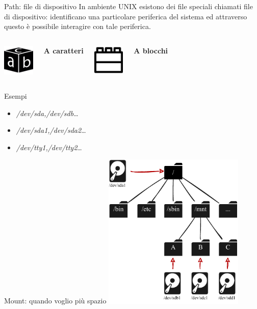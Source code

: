 \documentclass{beamer}
\begin{document}
    \begin{frame}{Path: file di dispositivo}
        In ambiente UNIX esistono dei file speciali chiamati file di dispositivo:
        identificano una particolare periferica del sistema ed attraverso questo è possibile interagire con tale periferica. \\
        \vspace{0.25cm}
        \begin{columns}[t, onlytextwidth]
                \centering
                \includegraphics[height=1.5cm, keepaspectratio]{images/char.pdf}
                
                \textbf{A caratteri}

                \centering
                \includegraphics[height=1.5cm, keepaspectratio]{images/block.pdf}
                
                \textbf{A blocchi}
        \end{columns}

        \vspace{0.25cm}

        \begin{exampleblock}{Esempi}
            \begin{itemize}
                \item \textit{/dev/sda,/dev/sdb}\dots
                \item \textit{/dev/sda1,/dev/sda2}\dots
                \item \textit{/dev/tty1,/dev/tty2}\dots
            \end{itemize}
        \end{exampleblock}
    \end{frame}

    \begin{frame}{Mount: quando voglio più spazio}
        \centering
        \includegraphics[height=7.5cm, keepaspectratio]{images/mountpoint.pdf}
    \end{frame}
\end{document}
